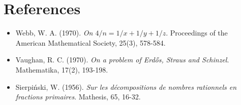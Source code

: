\documentclass[12pt, a4paper]{article}
\begin{document}
\section*{References}
\begin{itemize}
    \item Webb, W. A. (1970). \textit{On $4/n = 1/x + 1/y + 1/z$}. Proceedings of the American Mathematical Society, 25(3), 578-584.
    \item Vaughan, R. C. (1970). \textit{On a problem of Erd\H{o}s, Straus and Schinzel}. Mathematika, 17(2), 193-198.
    \item Sierpi\'nski, W. (1956). \textit{Sur les d\'ecompositions de nombres rationnels en fractions primaires}. Mathesis, 65, 16-32.
\end{itemize}
\end{document}
